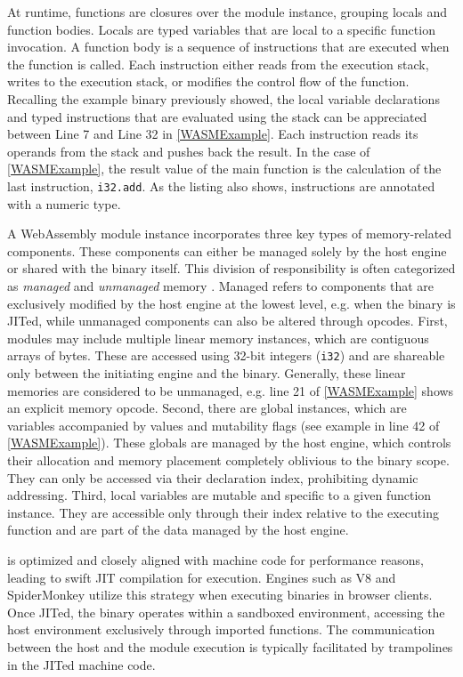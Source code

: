  At runtime, \Wasm functions are closures over the module instance, grouping locals and function bodies.
Locals are typed variables that are local to a specific function invocation.
A function body is a sequence of instructions that are executed when the function is called.
Each instruction either reads from the execution stack, writes to the execution stack, or modifies the control flow of the function.
Recalling the example \wasm binary previously showed, 
the local variable declarations and typed instructions that are evaluated using the stack can be appreciated between Line 7 and Line 32 in \autoref{WASMExample}. 
Each instruction reads its operands from the stack and pushes back the result. 
In the case of \autoref{WASMExample}, the result value of the main function is the calculation of the last instruction, \texttt{i32.add}. 
As the listing also shows, instructions are annotated with a numeric type.


 A WebAssembly module instance incorporates three key types of memory-related components. 
These components can either be managed solely by the host engine or shared with the \Wasm binary itself. 
This division of responsibility is often categorized as \emph{managed} and \emph{unmanaged} memory \cite{usenixWasm2020}. 
Managed refers to components that are exclusively modified by the host engine at the lowest level, e.g. when the \Wasm binary is JITed, while unmanaged components can also be altered through  \Wasm opcodes.
First, modules may include multiple linear memory instances, which are contiguous arrays of bytes. 
These are accessed using 32-bit integers (\texttt{i32}) and are shareable only between the initiating engine and the \Wasm binary. 
Generally, these linear memories are considered to be unmanaged, e.g. line 21 of \autoref{WASMExample} shows an explicit memory opcode. 
Second, there are global instances, which are variables accompanied by values and mutability flags (see example in line 42 of \autoref{WASMExample}). 
These globals are managed by the host engine, which controls their allocation and memory placement completely oblivious to the \Wasm binary scope. 
They can only be accessed via their declaration index, prohibiting dynamic addressing. 
Third, local variables are mutable and specific to a given function instance. 
They are accessible only through their index relative to the executing function and are part of the data managed by the host engine.


\Wasm is optimized and closely aligned with machine code for performance reasons, leading to swift JIT compilation for execution.
Engines such as V8 and SpiderMonkey utilize this strategy when executing \Wasm binaries in browser clients.
Once JITed, the \Wasm binary operates within a sandboxed environment, accessing the host environment exclusively through imported functions.
The communication between the host and the \Wasm module execution is typically facilitated by trampolines in the JITed machine code.

